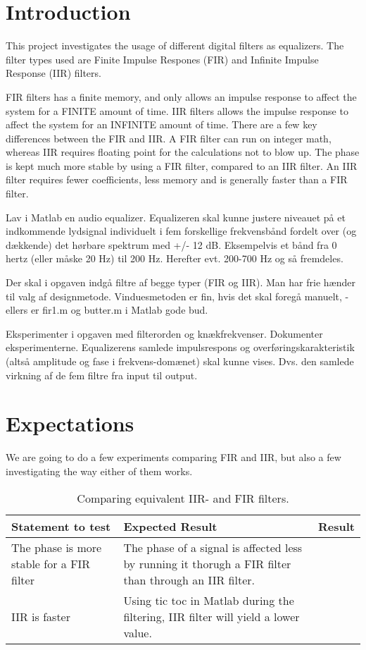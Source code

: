
\section{Introduction}
This project investigates the usage of different digital filters as equalizers. The filter types used are Finite Impulse Respones (FIR) and Infinite Impulse Response (IIR) filters.

FIR filters has a finite memory, and only allows an impulse response to affect the system for a FINITE amount of time.
IIR filters allows the impulse response to affect the system for an INFINITE amount of time.
There are a few key differences between the FIR and IIR.
A FIR filter can run on integer math, whereas IIR requires floating point for the calculations not to blow up. The phase is kept much more stable by using a FIR filter, compared to an IIR filter.
An IIR filter requires fewer coefficients, less memory and is generally faster than a FIR filter.

Lav i Matlab en audio equalizer. Equalizeren skal kunne justere niveauet på et indkommende lydsignal individuelt i fem forskellige frekvensbånd fordelt over (og dækkende) det hørbare spektrum med +/- 12 dB. Eksempelvis et bånd fra 0 hertz (eller måske 20 Hz) til 200 Hz. Herefter evt. 200-700 Hz og så fremdeles.

Der skal i opgaven indgå filtre af begge typer (FIR og IIR). Man har frie hænder til valg af designmetode. Vinduesmetoden er fin, hvis det skal foregå manuelt, - ellers er fir1.m og butter.m i Matlab gode bud.

Eksperimenter i opgaven med filterorden og knækfrekvenser. Dokumenter eksperimenterne. Equalizerens samlede impulsrespons og overføringskarakteristik (altså amplitude og fase i frekvens-domænet) skal kunne vises. Dvs. den samlede virkning af de fem filtre fra input til output.

\section{Expectations}
We are going to do a few experiments comparing FIR and IIR, but also a few investigating the way either of them works.

\begin{table}
	\caption{Comparing equivalent IIR- and FIR filters.}
	\label{tab:IIRvsFIR}
	\begin{tabularx}{\textwidth}{X X X}
		Statement to test	& Expected Result	& Result \\
		\toprule
		The phase is more stable for a FIR filter & The phase of a signal is affected less by running it thorugh a FIR filter than through an IIR filter. & \\
		IIR is faster		& Using tic toc in Matlab during the filtering, IIR filter will yield a lower value. & \\
	\end{tabularx}
\end{table}

